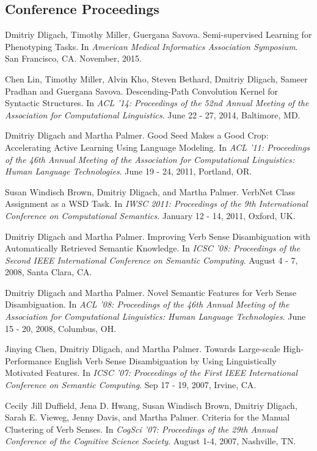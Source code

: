 \documentclass[letterpaper]{article}
\renewenvironment{itemize}{
  \begin{list}{}{
    \setlength{\leftmargin}{1.5em}
  }
}{
  \end{list}
}
\begin{document}
\subsection*{Conference Proceedings}

\begin{itemize}
\item Dmitriy Dligach, Timothy Miller, Guergana Savova. Semi-supervised Learning for Phenotyping Tasks. In \emph{American Medical Informatics Association Symposium}. San Francisco, CA. November, 2015.
\item Chen Lin, Timothy Miller, Alvin Kho, Steven Bethard, Dmitriy Dligach, Sameer Pradhan and Guergana Savova. Descending-Path Convolution Kernel for Syntactic Structures. In \emph {ACL '14: Proceedings of the 52nd Annual Meeting of the Association for Computational Linguistics}. June 22 - 27, 2014, Baltimore, MD.
\item Dmitriy Dligach and Martha Palmer. Good Seed Makes a Good Crop: Accelerating Active Learning Using Language Modeling. In \emph {ACL '11: Proceedings of the 46th Annual Meeting of the Association for Computational Linguistics: Human Language Technologies}. June 19 - 24, 2011, Portland, OR. 
\item Susan Windisch Brown, Dmitriy Dligach, and Martha Palmer. VerbNet Class Assignment as a WSD Task. In \emph {IWSC 2011: Proceedings of the 9th International Conference on Computational Semantics}. January 12 - 14, 2011, Oxford, UK. 
\item Dmitriy Dligach and Martha Palmer. Improving Verb Sense Disambiguation with Automatically Retrieved Semantic Knowledge. In \emph {ICSC '08: Proceedings of the Second IEEE International Conference on Semantic Computing}. August 4 - 7, 2008, Santa Clara, CA.
\item Dmitriy Dligach and Martha Palmer. Novel Semantic Features for Verb Sense Disambiguation. In \emph {ACL '08: Proceedings of the 46th Annual Meeting of the Association for Computational Linguistics: Human Language Technologies}. June 15 - 20, 2008, Columbus, OH. 
\item Jinying Chen, Dmitriy Dligach, and Martha Palmer. Towards Large-scale High-Performance English Verb Sense Disambiguation by Using Linguistically Motivated Features. In \emph {ICSC '07: Proceedings of the First IEEE International Conference on Semantic Computing}. Sep 17 - 19, 2007, Irvine, CA.
\item Cecily Jill Duffield, Jena D. Hwang, Susan Windisch Brown, Dmitriy Dligach, Sarah E. Vieweg, Jenny Davis, and Martha Palmer. Criteria for the Manual Clustering of Verb Senses. In \emph {CogSci '07: Proceedings of the 29th Annual Conference of the Cognitive Science Society}. August 1-4, 2007, Nashville, TN.
\end{itemize}
\end{document}
